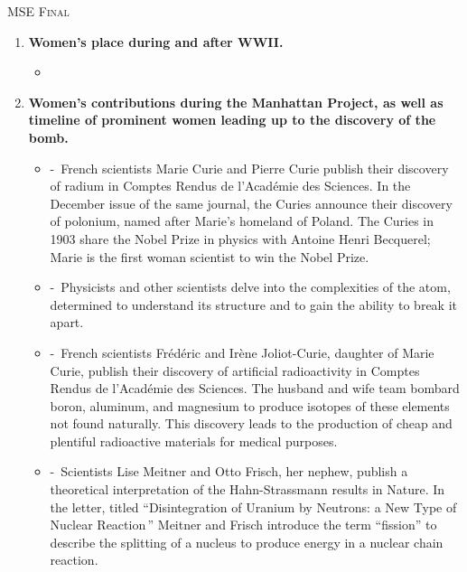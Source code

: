 \documentclass[12pt,a4paper]{article}
\begin{document}
  \begin{center}
    \large\textsc{MSE Final}
  \end{center}

  \begin{enumerate}
    \item \textbf{Women's place during and after WWII.}
    \begin{itemize}
      \item[] 
    \end{itemize}
    \item \textbf{Women's contributions during the Manhattan Project, as well as timeline of prominent women leading up to the discovery of the bomb.}
    \begin{itemize}
      \item[]  -\ French scientists Marie Curie and Pierre Curie publish their discovery of radium in Comptes Rendus de l'Académie des Sciences. In the December issue of the same journal, the Curies announce their discovery of polonium, named after Marie's homeland of Poland. The Curies in 1903 share the Nobel Prize in physics with Antoine Henri Becquerel; Marie is the first woman scientist to win the Nobel Prize.
      \item[]  -\ Physicists and other scientists delve into the complexities of the atom, determined to understand its structure and to gain the ability to break it apart.
      \item[]  -\ French scientists Frédéric and Irène Joliot-Curie, daughter of Marie Curie, publish their discovery of artificial radioactivity in Comptes Rendus de l'Académie des Sciences. The husband and wife team bombard boron, aluminum, and magnesium to produce isotopes of these elements not found naturally. This discovery leads to the production of cheap and plentiful radioactive materials for medical purposes.
      \item[]  -\ Scientists Lise Meitner and Otto Frisch, her nephew, publish a theoretical interpretation of the Hahn-Strassmann results in Nature. In the letter, titled ``Disintegration of Uranium by Neutrons: a New Type of Nuclear Reaction\,'' Meitner and Frisch introduce the term ``fission'' to describe the splitting of a nucleus to produce energy in a nuclear chain reaction.

\end{itemize}
\end{enumerate}
\end{document}
